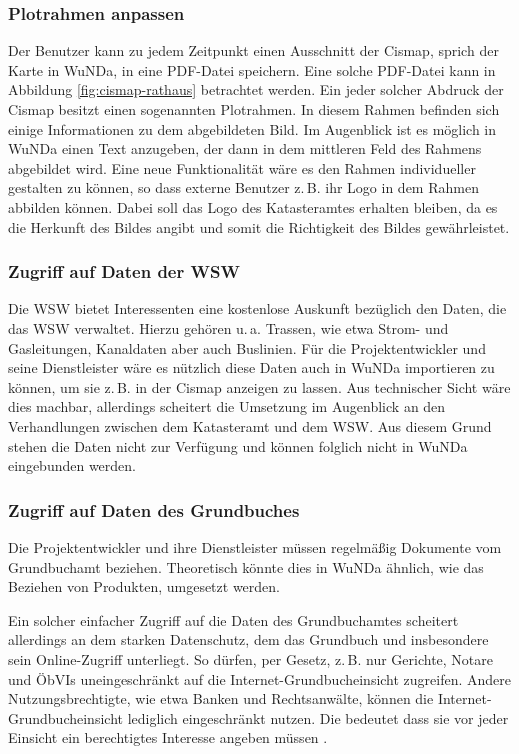 \subsubsection{Plotrahmen anpassen}
Der Benutzer kann zu jedem Zeitpunkt einen Ausschnitt der Cismap, sprich der Karte in \ac{WuNDa}, in eine PDF-Datei speichern.
Eine solche PDF-Datei kann in Abbildung \vref{fig:cismap-rathaus} betrachtet werden.
Ein jeder solcher Abdruck der Cismap besitzt einen sogenannten Plotrahmen. In diesem Rahmen befinden sich einige Informationen zu dem abgebildeten Bild.
Im Augenblick ist es möglich in \ac{WuNDa} einen Text anzugeben, der dann in dem mittleren Feld des Rahmens abgebildet wird.
Eine neue Funktionalität wäre es den Rahmen individueller gestalten zu können, so dass externe Benutzer z.\,B. ihr Logo in dem Rahmen abbilden können.
Dabei soll das Logo des Katasteramtes erhalten bleiben, da es die Herkunft des Bildes angibt und somit die Richtigkeit des Bildes gewährleistet. 

\subsubsection{Zugriff auf Daten der WSW}
Die \ac{WSW} bietet Interessenten eine kostenlose Auskunft bezüglich den Daten, die das \ac{WSW} verwaltet.
Hierzu gehören u.\,a. Trassen, wie etwa Strom- und Gasleitungen, Kanaldaten aber auch Buslinien.
Für die Projektentwickler und seine Dienstleister wäre es nützlich diese Daten auch in \ac{WuNDa} importieren zu können, um sie z.\,B. in der Cismap anzeigen zu lassen.
Aus technischer Sicht wäre dies machbar, allerdings scheitert die Umsetzung im Augenblick an den Verhandlungen zwischen dem Katasteramt und dem \ac{WSW}.
Aus diesem Grund stehen die Daten nicht zur Verfügung und können folglich nicht in \ac{WuNDa} eingebunden werden.
\subsubsection{Zugriff auf Daten des Grundbuches}
Die Projektentwickler und ihre Dienstleister müssen regelmäßig Dokumente vom Grundbuchamt beziehen.
Theoretisch könnte dies in \ac{WuNDa} ähnlich, wie das Beziehen von Produkten, umgesetzt werden.

Ein solcher einfacher Zugriff auf die Daten des Grundbuchamtes scheitert allerdings an dem starken Datenschutz, dem das Grundbuch und insbesondere sein Online-Zugriff unterliegt.
So dürfen, per Gesetz, z.\,B. nur Gerichte, Notare und \acp{ÖbVI} uneingeschränkt auf die Internet-Grundbucheinsicht zugreifen.
Andere Nutzungsbrechtigte, wie etwa Banken und Rechtsanwälte, können die Internet-Grundbucheinsicht lediglich eingeschränkt nutzen.
Die bedeutet dass sie vor jeder Einsicht ein berechtigtes Interesse angeben müssen \autocite[vgl.][]{justiz-grundbucheinsicht}.

